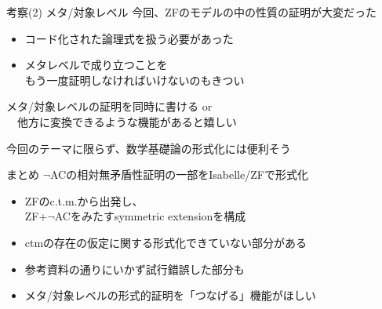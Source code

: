 \documentclass[17pt,aspectratio=169]{beamer}
\begin{document}
\begin{frame}{考察(2) メタ/対象レベル}
    今回、ZFのモデルの中の性質の証明が大変だった
    {\small 
    \begin{itemize}[itemsep=5pt]
        \item コード化された論理式を扱う必要があった
        \item メタレベルで成り立つことを\\
              もう一度証明しなければいけないのもきつい
    \end{itemize}}

    \textcolor{red}{\blacktriangleright}{\small 
    メタ/対象レベルの証明を同時に書ける or\\
    \,\,\,\,\,\,他方に変換できるような機能があると嬉しい}

    \textcolor{red}{\blacktriangleright}{\small 
    今回のテーマに限らず、数学基礎論の形式化には便利そう} 
\end{frame}

\begin{frame}{まとめ}
    $\neg$ACの相対無矛盾性証明{\small の一部}をIsabelle/ZFで形式化
    {\small
    \begin{itemize}[itemsep=8pt]
        \item ZFのc.t.m.から出発し、\\ZF+$\neg$ACをみたすsymmetric extensionを構成
        \item ctmの存在の仮定に関する形式化できていない部分がある
        \item 参考資料の通りにいかず試行錯誤した部分も
        \item メタ/対象レベルの形式的証明を「つなげる」機能がほしい
    \end{itemize}
    }
\end{frame}

\appendix
{}
 
\end{document}
